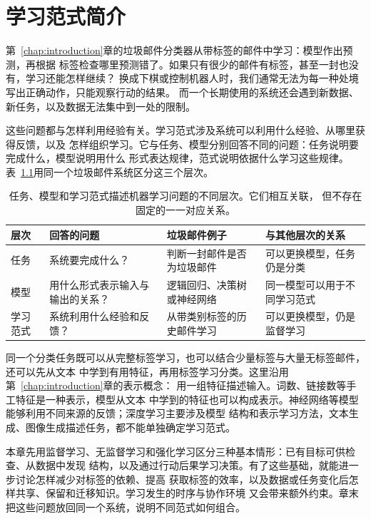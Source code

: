 \chapter{学习范式简介}
\label{chap:machine-learning-paradigms}

第~\ref{chap:introduction}章的垃圾邮件分类器从带标签的邮件中学习：模型作出预测，再根据
标签检查哪里预测错了。如果只有很少的邮件有标签，甚至一封也没有，学习还能怎样继续？
换成下棋或控制机器人时，我们通常无法为每一种处境写出正确动作，只能观察行动的结果。
而一个长期使用的系统还会遇到新数据、新任务，以及数据无法集中到一处的限制。

这些问题都与怎样利用经验有关。学习范式涉及系统可以利用什么经验、从哪里获得反馈，以及
怎样组织学习。它与任务、模型分别回答不同的问题：任务说明要完成什么，模型说明用什么
形式表达规律，范式说明依据什么学习这些规律。
表~\ref{tab:task-paradigm-model}用同一个垃圾邮件系统区分这三个层次。

\begin{table}[htbp]
  \centering
  \small
  \begin{tabularx}{\linewidth}{@{}lXXX@{}}
    \toprule
    \textbf{层次} & \textbf{回答的问题} & \textbf{垃圾邮件例子} & \textbf{与其他层次的关系} \\
    \midrule
    任务 & 系统要完成什么？ & 判断一封邮件是否为垃圾邮件 & 可以更换模型，任务仍是分类 \\
    模型 & 用什么形式表示输入与输出的关系？ & 逻辑回归、决策树或神经网络 & 同一模型可以用于不同学习范式 \\
    学习范式 & 系统利用什么经验和反馈？ & 从带类别标签的历史邮件学习 & 可以更换模型，仍是监督学习 \\
    \bottomrule
  \end{tabularx}
  \caption{任务、模型和学习范式描述机器学习问题的不同层次。它们相互关联，
  但不存在固定的一一对应关系。}
  \label{tab:task-paradigm-model}
\end{table}
\FloatBarrier

同一个分类任务既可以从完整标签学习，也可以结合少量标签与大量无标签邮件，还可以先从文本
中学到有用特征，再用标签学习分类。这里沿用第~\ref{chap:introduction}章的表示概念：
用一组特征描述输入。词数、链接数等手工特征是一种表示，模型从文本
中学到的特征也可以构成表示。神经网络等模型能够利用不同来源的反馈；深度学习主要涉及模型
结构和表示学习方法，文本生成、图像生成描述任务，都不能单独确定学习范式。

本章先用监督学习、无监督学习和强化学习区分三种基本情形：已有目标可供检查、从数据中发现
结构，以及通过行动后果学习决策。有了这些基础，就能进一步讨论怎样减少对标签的依赖、提高
获取标签的效率，以及数据或任务变化后怎样共享、保留和迁移知识。学习发生的时序与协作环境
又会带来额外约束。章末把这些问题放回同一个系统，说明不同范式如何组合。

